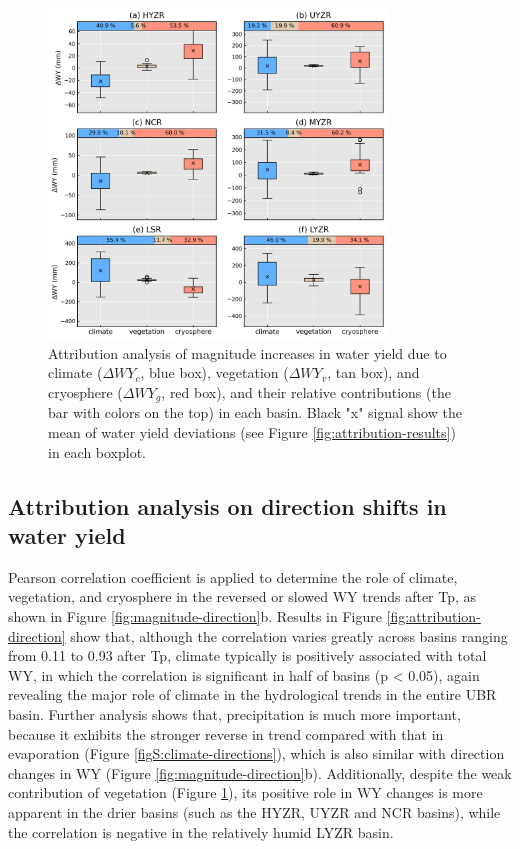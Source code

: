 \documentclass[hess, manuscript]{copernicus}
\begin{document}
\begin{figure}[ht]
    \includegraphics[width=0.8\textwidth]{02-figures/attribution-in-magnitude.png}
    \caption{Attribution analysis of magnitude increases in water yield due to climate ($\Delta WY_c$, blue box), vegetation ($\Delta WY_v$, tan box), and cryosphere ($\Delta WY_g$, red box), and their relative contributions (the bar with colors on the top) in each basin.  Black "x" signal show the mean of water yield deviations (see Figure \ref{fig:attribution-results}) in each boxplot.}
    \label{fig:attribution-magnitude}
\end{figure}

\subsection{Attribution analysis on direction shifts in water yield}
Pearson correlation coefficient is applied to determine the role of climate, vegetation, and cryosphere in the reversed or slowed WY trends after Tp, as shown in Figure \ref{fig:magnitude-direction}b. Results in Figure \ref{fig:attribution-direction} show that, although the correlation varies greatly across basins ranging from 0.11 to 0.93 after Tp, climate typically is positively associated with total WY, in which the correlation is significant in half of basins (p < 0.05), again revealing the major role of climate in the hydrological trends in the entire UBR basin. Further analysis shows that, precipitation is much more important, because it exhibits the stronger reverse in trend compared with that in evaporation (Figure \ref{figS:climate-directions}), which is also similar with direction changes in WY (Figure \ref{fig:magnitude-direction}b). Additionally, despite the weak contribution of vegetation (Figure \ref{fig:attribution-magnitude}), its positive role in WY changes is more apparent in the drier basins (such as the HYZR, UYZR and NCR basins), while the correlation is negative in the relatively humid LYZR basin.
\end{document}
